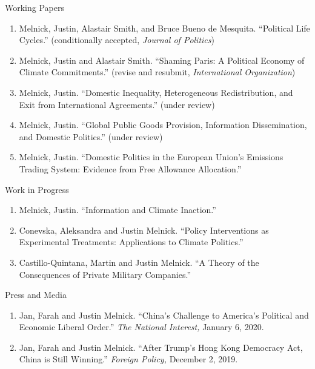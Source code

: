 \documentclass{resume} %
\begin{document}
\begin{rSection}{Working Papers}

\begin{enumerate}

    \item Melnick, Justin, Alastair Smith, and Bruce Bueno de Mesquita. ``Political Life Cycles.'' (conditionally accepted, \textit{Journal of Politics})
        \item Melnick, Justin and Alastair Smith. ``Shaming Paris: A Political Economy of Climate Commitments.'' (revise and resubmit, \textit{International Organization})
            \item Melnick, Justin. ``Domestic Inequality, Heterogeneous Redistribution, and Exit from International Agreements.'' (under review)
                \item Melnick, Justin. ``Global Public Goods Provision, Information Dissemination, and Domestic Politics.'' (under review)
        \item Melnick, Justin. ``Domestic Politics in the European Union’s Emissions Trading System: Evidence from Free Allowance Allocation.''
\end{enumerate}

\end{rSection}

\begin{rSection}{Work in Progress}

\begin{enumerate}
    \item Melnick, Justin. ``Information and Climate Inaction.''
    \item Conevska, Aleksandra and Justin Melnick. ``Policy Interventions as Experimental Treatments: Applications to Climate Politics.''
    \item Castillo-Quintana, Martin and Justin Melnick. ``A Theory of the Consequences of Private Military Companies.''
\end{enumerate}

\end{rSection}

\begin{rSection}{Press and Media}
    \begin{enumerate}
    \item   Jan, Farah and Justin Melnick. ``China's Challenge to America's Political and Economic Liberal Order.'' \textit{The National Interest,} January 6, 2020.
    \item    Jan, Farah and Justin Melnick. ``After Trump's Hong Kong Democracy Act, China is Still Winning.'' \textit{Foreign Policy,} December 2, 2019.
\end{enumerate}
\end{rSection}
\end{document}
